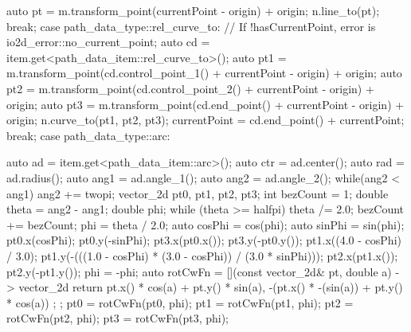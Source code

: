 \begin{codeblock}
{{{    auto pt = m.transform_point(currentPoint - origin) + origin;
    n.line_to(pt);
  } break;
  case path_data_type::rel_curve_to:
  {
    // If !hasCurrentPoint, error is io2d_error::no_current_point;
    auto cd = item.get<path_data_item::rel_curve_to>();
    auto pt1 = m.transform_point(cd.control_point_1() + currentPoint -
      origin) + origin;
    auto pt2 = m.transform_point(cd.control_point_2() + currentPoint -
      origin) + origin;
    auto pt3 = m.transform_point(cd.end_point() + currentPoint - origin) +
      origin;
    n.curve_to(pt1, pt2, pt3);
    currentPoint = cd.end_point() + currentPoint;
  } break;
  case path_data_type::arc:
  {
    auto ad = item.get<path_data_item::arc>();
    auto ctr = ad.center();
    auto rad = ad.radius();
    auto ang1 = ad.angle_1();
    auto ang2 = ad.angle_2();
    while(ang2 < ang1) {
      ang2 += twopi;
    }
    vector_2d pt0, pt1, pt2, pt3;
    int bezCount = 1;
    double theta = ang2 - ang1;
    double phi;
    while (theta >= halfpi) {
      theta /= 2.0;
      bezCount += bezCount;
    }
    phi = theta / 2.0;
    auto cosPhi = cos(phi);
    auto sinPhi = sin(phi);
    pt0.x(cosPhi);
    pt0.y(-sinPhi);
    pt3.x(pt0.x());
    pt3.y(-pt0.y());
    pt1.x((4.0 - cosPhi) / 3.0);
    pt1.y(-(((1.0 - cosPhi) * (3.0 - cosPhi)) / (3.0 * sinPhi)));
    pt2.x(pt1.x());
    pt2.y(-pt1.y());
    phi = -phi;
    auto rotCwFn = [](const vector_2d& pt, double a) -> vector_2d {
      return { pt.x() * cos(a) + pt.y() * sin(a),
        -(pt.x() * -(sin(a)) + pt.y() * cos(a)) };
    };
    pt0 = rotCwFn(pt0, phi);
    pt1 = rotCwFn(pt1, phi);
    pt2 = rotCwFn(pt2, phi);
    pt3 = rotCwFn(pt3, phi);
    
}}}
\end{codeblock}
